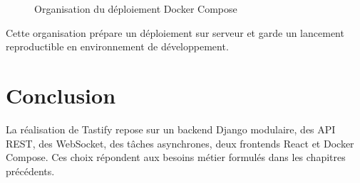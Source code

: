\begin{figure}[H]
\centering
{}
\caption{Organisation du déploiement Docker Compose}
\label{fig:docker-compose}
\end{figure}

Cette organisation prépare un déploiement sur serveur et garde un lancement reproductible en environnement de développement.

\section*{Conclusion}
La réalisation de Tastify repose sur un backend Django modulaire, des API REST, des WebSocket, des tâches asynchrones, deux frontends React et Docker Compose. Ces choix répondent aux besoins métier formulés dans les chapitres précédents.

